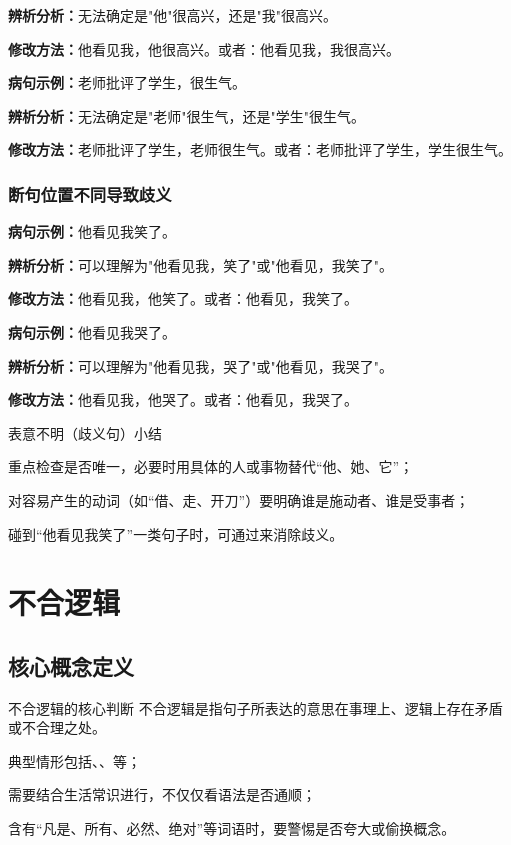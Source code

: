 \documentclass[a4paper,12pt]{ctexrep}
\newcommand{\exampleicon}{\textcolor{highlight}{\faExclamationTriangle}}
\newcommand{\analysisicon}{\textcolor{accent}{\faSearch}}
\newcommand{\revisionicon}{\textcolor{secondary}{\faCheckCircle}}
\begin{document}
\analysisicon \textbf{辨析分析：}无法确定是"他"很高兴，还是"我"很高兴。

\revisionicon \textbf{修改方法：}他看见我，他很高兴。或者：他看见我，我很高兴。

\exampleicon \textbf{病句示例：}老师批评了学生，很生气。

\analysisicon \textbf{辨析分析：}无法确定是"老师"很生气，还是"学生"很生气。

\revisionicon \textbf{修改方法：}老师批评了学生，老师很生气。或者：老师批评了学生，学生很生气。

\subsection{断句位置不同导致歧义}
\exampleicon \textbf{病句示例：}他看见我笑了。

\analysisicon \textbf{辨析分析：}可以理解为"他看见我，笑了"或"他看见，我笑了"。

\revisionicon \textbf{修改方法：}他看见我，他笑了。或者：他看见，我笑了。

\exampleicon \textbf{病句示例：}他看见我哭了。

\analysisicon \textbf{辨析分析：}可以理解为"他看见我，哭了"或"他看见，我哭了"。

\revisionicon \textbf{修改方法：}他看见我，他哭了。或者：他看见，我哭了。

\begin{summarybox}{表意不明（歧义句）小结}
\begin{focuspoints}
  \item 重点检查是否唯一，必要时用具体的人或事物替代“他、她、它”；
  \item 对容易产生的动词（如“借、走、开刀”）要明确谁是施动者、谁是受事者；
  \item 碰到“他看见我笑了”一类句子时，可通过来消除歧义。
\end{focuspoints}
\end{summarybox}

\chapter{不合逻辑}
\section{核心概念定义}
\begin{conceptbox}{不合逻辑的核心判断}
不合逻辑是指句子所表达的意思在事理上、逻辑上存在矛盾或不合理之处。
\begin{focuspoints}
  \item 典型情形包括、、等；
  \item 需要结合生活常识进行，不仅仅看语法是否通顺；
  \item 含有“凡是、所有、必然、绝对”等词语时，要警惕是否夸大或偷换概念。
\end{focuspoints}
\end{conceptbox}
\end{document}
